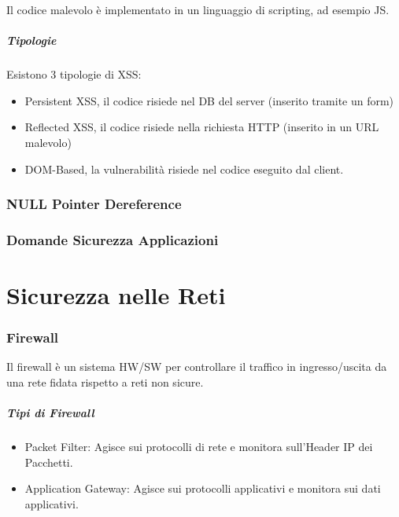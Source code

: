 \documentclass[12pt, a4paper, openany]{book}
\begin{document}
Il codice malevolo è implementato in un linguaggio di scripting, ad esempio JS.

\paragraph{Tipologie}
Esistono 3 tipologie di XSS:
\begin{itemize}
    \item Persistent XSS, il codice risiede nel DB del server (inserito tramite un form)
    \item Reflected XSS, il codice risiede nella richiesta HTTP (inserito in un URL malevolo)
    \item DOM-Based, la vulnerabilità risiede nel codice eseguito dal client.
\end{itemize}

\subsection{NULL Pointer Dereference} %


\subsection{Domande Sicurezza Applicazioni}

\chapter{Sicurezza nelle Reti}
\subsection{Firewall}
Il firewall è un sistema HW/SW per controllare il traffico in ingresso/uscita da una rete fidata rispetto a reti non sicure.

\paragraph*{Tipi di Firewall}
\begin{itemize}
    \item Packet Filter: Agisce sui protocolli di rete e monitora sull'Header IP dei Pacchetti.
    \item Application Gateway: Agisce sui protocolli applicativi e monitora sui dati applicativi.
\end{itemize}
\end{document}
